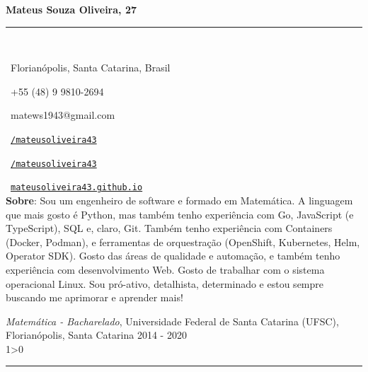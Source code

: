 \documentclass[a4paper,10pt]{article}
\makeatletter
\newcommand{\profissional}{Mateus Souza Oliveira}
\newcommand{\idade}{27}
\newcommand{\Endereco}{Florianópolis, Santa Catarina, Brasil}
\newcommand{\telefone}{+55 (48) 9 9810-2694}
\newcommand{\email}{matews1943@gmail.com}
\newcommand{\sobre}{
    Sou um engenheiro de software e formado em Matemática. A linguagem que mais gosto é Python, mas também tenho experiência com Go, JavaScript (e TypeScript), SQL e, claro, Git. Também tenho experiência com Containers (Docker, Podman), e ferramentas de orquestração (OpenShift, Kubernetes, Helm, Operator SDK). Gosto das áreas de qualidade e automação, e também tenho experiência com desenvolvimento Web. Gosto de trabalhar com o sistema operacional Linux. Sou pró-ativo, detalhista, determinado e estou sempre buscando me aprimorar e aprender mais!
    \vspace{1\baselineskip}
}
\newcommand{\criaSecao}[4][0]{
	\begin{tcolorbox}[
        blanker,
        breakable,
        title=\begin{minipage}{0.16\linewidth}\large{\textbf{#2}}\vspace{-#3\baselineskip}\end{minipage},
        coltitle=black,
        leftupper=0.21\linewidth,
    ]
        #4
		\ifnum0#1>0 { \hrule {\ } } \fi
    \end{tcolorbox}
}
\makeatother
\begin{document}
	\begin{minipage}{0.65\linewidth}
		\Huge{\bf \profissional, \idade}\\\vspace{-1.75\baselineskip}

		\noindent\rule{\textwidth}{1.5pt} {\ }\\\vspace{-1.8\baselineskip}

		\large{
		\faMapMarker \ \Endereco \\
		\begin{minipage}{0.5\linewidth}
			\faWhatsapp \ \telefone
		\end{minipage}
		\begin{minipage}{0.5\linewidth}
			\faEnvelope \ \email
		\end{minipage}
		\begin{minipage}{0.5\linewidth}
			\faLinkedinSquare \ \href{https://www.linkedin.com/in/mateusoliveira43/}{\texttt{/mateusoliveira43}}
		\end{minipage}
		\begin{minipage}{0.5\linewidth}
			\faGithub \ \href{https://github.com/mateusoliveira43}{\texttt{/mateusoliveira43}}
		\end{minipage}
		\faLink \ \href{https://mateusoliveira43.github.io/}{\texttt{mateusoliveira43.github.io}}\\
		\vfill
		\textbf{Sobre}:\sobre
		}
	\end{minipage}
	\vspace{\baselineskip}

    \criaSecao[1]{Educação}{2}{
		\textit{Matemática - Bacharelado}, Universidade Federal de Santa Catarina (UFSC), Florianópolis, Santa Catarina \hfill 2014 - 2020 \\
    }
\end{document}
